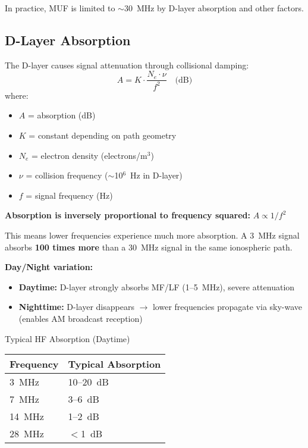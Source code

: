 In practice, MUF is limited to $\sim$30~MHz by D-layer absorption and other factors.

\subsection{D-Layer Absorption}

The D-layer causes signal attenuation through collisional damping:
\begin{equation}
A = K \cdot \frac{N_e \cdot \nu}{f^2} \quad \text{(dB)}
\end{equation}
where:
\begin{itemize}
\item $A$ = absorption (dB)
\item $K$ = constant depending on path geometry
\item $N_e$ = electron density (electrons/m$^3$)
\item $\nu$ = collision frequency ($\sim$10$^6$~Hz in D-layer)
\item $f$ = signal frequency (Hz)
\end{itemize}

\begin{keyconcept}
\textbf{Absorption is inversely proportional to frequency squared:} $A \propto 1/f^2$

This means lower frequencies experience much more absorption. A 3~MHz signal absorbs \textbf{100 times more} than a 30~MHz signal in the same ionospheric path.
\end{keyconcept}

\textbf{Day/Night variation:}
\begin{itemize}
\item \textbf{Daytime:} D-layer strongly absorbs MF/LF (1--5~MHz), severe attenuation
\item \textbf{Nighttime:} D-layer disappears $\rightarrow$ lower frequencies propagate via sky-wave (enables AM broadcast reception)
\end{itemize}

\begin{calloutbox}{Typical HF Absorption (Daytime)}
\begin{tabular}{@{}ll@{}}
\toprule
Frequency & Typical Absorption \\
\midrule
3~MHz & 10--20~dB \\
7~MHz & 3--6~dB \\
14~MHz & 1--2~dB \\
28~MHz & $<$1~dB \\
\bottomrule
\end{tabular}
\end{calloutbox}

